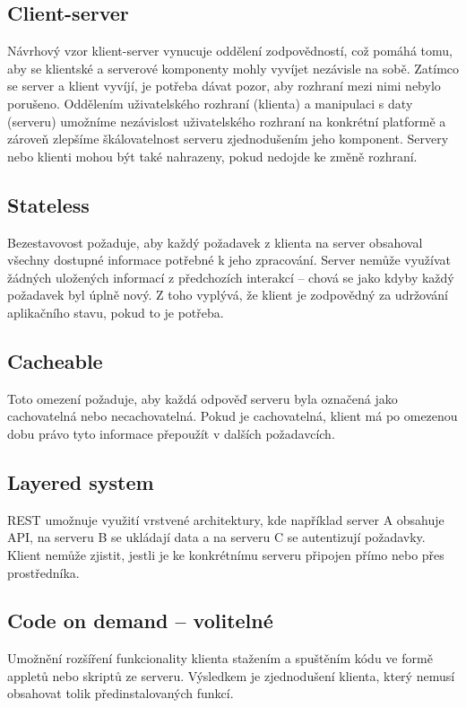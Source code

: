 \documentclass[thesis=M,czech]{FITthesis}[2019/12/23]
\begin{document}
\subsection{Client-server}
Návrhový vzor klient-server vynucuje oddělení zodpovědností, což pomáhá tomu, aby se klientské a serverové komponenty mohly vyvíjet nezávisle na sobě. Zatímco se server a klient vyvíjí, je potřeba dávat pozor, aby rozhraní mezi nimi nebylo porušeno.
Oddělením uživatelského rozhraní (klienta) a manipulaci s daty (serveru) umožníme nezávislost uživatelského rozhraní na konkrétní platformě a zároveň zlepšíme škálovatelnost serveru zjednodušením jeho komponent. Servery nebo klienti mohou být také nahrazeny, pokud nedojde ke změně rozhraní.

\subsection{Stateless}
Bezestavovost požaduje, aby každý požadavek z klienta na server obsahoval všechny dostupné informace potřebné k jeho zpracování. Server nemůže využívat žádných uložených informací z předchozích interakcí -- chová se jako kdyby každý požadavek byl úplně nový. Z toho vyplývá, že klient je zodpovědný za udržování aplikačního stavu, pokud to je potřeba.

\subsection{Cacheable}
Toto omezení požaduje, aby každá odpověď serveru byla označená jako cachovatelná nebo necachovatelná. Pokud je cachovatelná, klient má po omezenou dobu právo tyto informace přepoužít v dalších požadavcích.

\subsection{Layered system}
REST umožnuje využití vrstvené architektury, kde například server A obsahuje API, na serveru B se ukládají data a na serveru C se autentizují požadavky. Klient nemůže zjistit, jestli je ke konkrétnímu serveru připojen přímo nebo přes prostředníka.

\subsection{Code on demand -- volitelné}
Umožnění rozšíření funkcionality klienta stažením a spuštěním kódu ve formě appletů nebo skriptů ze serveru. Výsledkem je zjednodušení klienta, který nemusí obsahovat tolik předinstalovaných funkcí.
\end{document}
